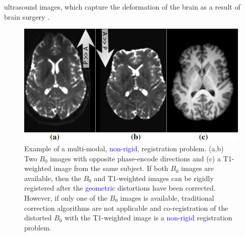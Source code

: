 ultrasound images, which capture the deformation of the brain as a result of brain surgery \cite{Rivaz2015, DeNigris2012}.


\begin{figure}[t!]
\centering
    \includegraphics[width=1\linewidth]{images/T1B0Result/figure1.png}
    \closer
    \caption{{\small Example of a multi-modal, \textcolor{blue}{non-rigid}, registration problem. (a,b) Two $B_{0}$ images with opposite phase-encode directions and (c) a T1-weighted image from the same subject. If both $B_{0}$ images are available, then the $B_{0}$ and T1-weighted images can be rigidly registered after the \textcolor{blue}{geometric} distortions have been corrected. However, if only one of the $B_{0}$ images is available, traditional correction algorithms are not applicable and co-registration of the distorted $B_{0}$ with the T1-weighted image is a \textcolor{blue}{non-rigid} registration problem.}}
\label{fig:example_t1b0_problem}\figcloser
\end{figure}
\vspace{-0.4cm}
